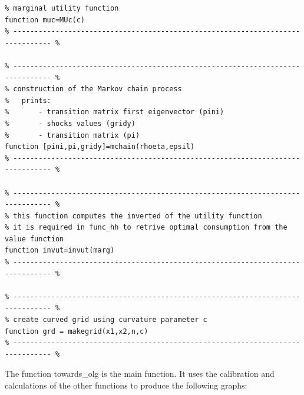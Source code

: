 \documentclass[12pt,a4paper]{article}
\begin{document}
\pagebreak
\begin{lstlisting}[frame=single]
% ------------------------------------------------------------------------------- %
% marginal utility function
function muc=MUc(c)
% ------------------------------------------------------------------------------- %

% ------------------------------------------------------------------------------- %
% construction of the Markov chain process
%   prints:
%       - transition matrix first eigenvector (pini)
%       - shocks values (gridy)
%       - transition matrix (pi)
function [pini,pi,gridy]=mchain(rhoeta,epsil)
% ------------------------------------------------------------------------------- %

% ------------------------------------------------------------------------------- %
% this function computes the inverted of the utility function
% it is required in func_hh to retrive optimal consumption from the value function
function invut=invut(marg)
% ------------------------------------------------------------------------------- %

% ------------------------------------------------------------------------------- %
% create curved grid using curvature parameter c
function grd = makegrid(x1,x2,n,c)
% ------------------------------------------------------------------------------- %
\end{lstlisting}

The function towards\_olg is the main function. It uses the calibration and calculations of the other functions to produce the following graphs:
\end{document}
